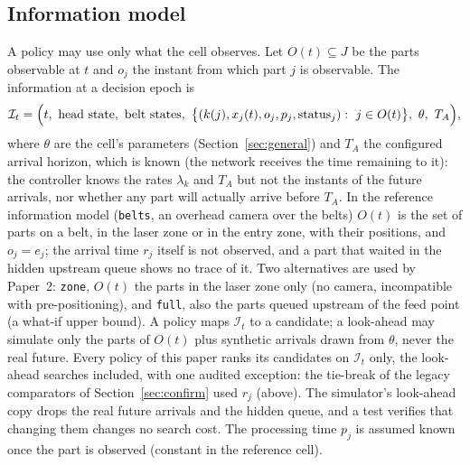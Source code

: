 \documentclass[11pt,a4paper]{article}
\theoremstyle{plain}
\theoremstyle{definition}
\theoremstyle{remark}
\newcommand{\I}{\mathcal I}
\begin{document}
\subsection{Information model}\label{sec:info}
A policy may use only what the cell observes. Let $O(t)\subseteq J$ be the parts
observable at $t$ and $o_j$ the instant from which part $j$ is observable. The
information at a decision epoch is
\begin{equation}\label{eq:info}
\I_t=\Bigl(t,\ \text{head state},\ \text{belt states},\
\bigl\{(k(j),x_j(t),o_j,p_j,\text{status}_j):\ j\in O(t)\bigr\},\ \theta,\ T_A\Bigr),
\end{equation}
where $\theta$ are the cell's parameters (Section~\ref{sec:general}) and $T_A$ the
configured arrival horizon, which is known (the network receives the time remaining to
it): the controller knows the rates $\lambda_k$ and $T_A$ but not the instants of the
future arrivals, nor whether any part will actually arrive before $T_A$. In the reference information model (\texttt{belts}, an overhead
camera over the belts) $O(t)$ is the set of parts on a belt, in the laser zone or in the
entry zone, with their positions, and $o_j=e_j$; the arrival time $r_j$ itself is not
observed, and a part that waited in the hidden upstream queue shows no trace of it. Two
alternatives are used by Paper~2: \texttt{zone}, $O(t)$ the parts in the laser zone only
(no camera, incompatible with pre-positioning), and \texttt{full}, also the parts queued
upstream of the feed point (a what-if upper bound). A policy maps $\I_t$ to a candidate; a
look-ahead may simulate only the parts of $O(t)$ plus synthetic arrivals drawn from
$\theta$, never the real future. Every policy of this paper ranks its candidates on $\I_t$ only,
the look-ahead searches included, with one audited exception: the tie-break of the
legacy comparators of Section~\ref{sec:confirm} used $r_j$ (above). The simulator's
look-ahead copy drops the real future arrivals
and the hidden queue, and a test verifies that changing them changes no search cost. The
processing time $p_j$ is assumed known once the part is observed (constant in the
reference cell).
\end{document}
